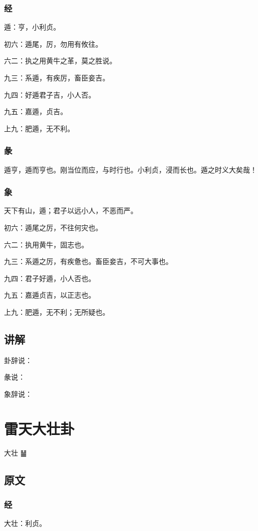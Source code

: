 \documentclass[12pt,oneside]{book}
\begin{document}
\subsection{经}
遁：亨，小利贞。

初六：遁尾，厉，勿用有攸往。

六二：执之用黄牛之革，莫之胜说。

九三：系遁，有疾厉，畜臣妾吉。

九四：好遁君子吉，小人否。

九五：嘉遁，贞吉。

上九：肥遁，无不利。

\subsection{彖}
遁亨，遁而亨也。刚当位而应，与时行也。小利贞，浸而长也。遁之时义大矣哉！

\subsection{象}
天下有山，遁；君子以远小人，不恶而严。

初六：遁尾之厉，不往何灾也。

六二：执用黄牛，固志也。

九三：系遁之厉，有疾惫也。畜臣妾吉，不可大事也。

九四：君子好遁，小人否也。

九五：嘉遁贞吉，以正志也。

上九：肥遁，无不利；无所疑也。

\section{讲解}
卦辞说：

彖说：

象辞说：


\chapter{雷天大壮卦}
大壮 {\Large ䷡}

\section{原文}

\subsection{经}
大壮：利贞。
\end{document}
